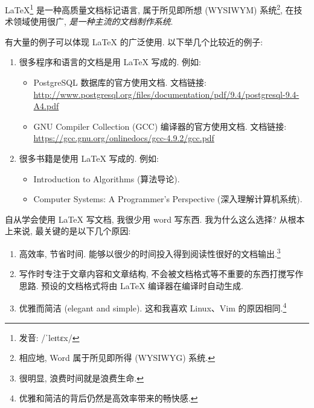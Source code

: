 \documentclass{article}
\begin{document}
LaTeX\footnote{发音: /ˈleɪtɛx/} 是一种高质量文档标记语言, 属于所见即所想 (WYSIWYM) 系统\footnote{相应地, Word 属于所见即所得 (WYSIWYG) 系统.}, 在技术领域使用很广, \emph{是一种主流的文档制作系统}.

有大量的例子可以体现 {\LaTeX} 的广泛使用. 以下举几个比较近的例子:
\begin{enumerate}
  \item 很多程序和语言的文档是用 {\LaTeX} 写成的. 例如:
    \begin{itemize}
      \item PostgreSQL 数据库的官方使用文档. 文档链接: \url{http://www.postgresql.org/files/documentation/pdf/9.4/postgresql-9.4-A4.pdf}
      \item GNU Compiler Collection (GCC) 编译器的官方使用文档. 文档链接: \url{https://gcc.gnu.org/onlinedocs/gcc-4.9.2/gcc.pdf}
    \end{itemize}
  \item 很多书籍是使用 {\LaTeX} 写成的. 例如:
    \begin{itemize}
      \item Introduction to Algorithms (算法导论).
      \item Computer Systems: A Programmer's Perspective (深入理解计算机系统).
    \end{itemize}
\end{enumerate}

自从学会使用 {\LaTeX} 写文档, 我很少用 word 写东西. 我为什么这么选择? 从根本上来说, 最关键的是以下几个原因:
\begin{enumerate}
  \item 高效率, 节省时间. 能够以很少的时间投入得到阅读性很好的文档输出.\footnote{很明显, 浪费时间就是浪费生命.}
  \item 写作时专注于文章内容和文章结构, 不会被文档格式等不重要的东西打搅写作思路. 预设的文档格式将由 {\LaTeX} 编译器在编译时自动生成.
  \item 优雅而简洁 (elegant and simple). 这和我喜欢 Linux、Vim 的原因相同.\footnote{优雅和简洁的背后仍然是高效率带来的畅快感.}
\end{enumerate}
\end{document}
